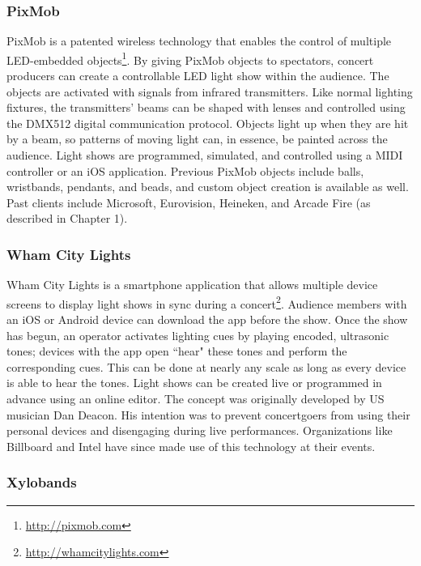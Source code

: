 \subsubsection{PixMob}

PixMob is a patented wireless technology that enables the control of multiple LED-embedded objects\footnote{\url{http://pixmob.com}}. By giving PixMob objects to spectators, concert producers can create a controllable LED light show within the audience. The objects are activated with signals from infrared transmitters. Like normal lighting fixtures, the transmitters' beams can be shaped with lenses and controlled using the DMX512 digital communication protocol. Objects light up when they are hit by a beam, so patterns of moving light can, in essence, be painted across the audience. Light shows are programmed, simulated, and controlled using a MIDI controller or an iOS application. Previous PixMob objects include balls, wristbands, pendants, and beads, and custom object creation is available as well. Past clients include Microsoft, Eurovision, Heineken, and Arcade Fire (as described in Chapter 1).

\subsubsection{Wham City Lights}

Wham City Lights is a smartphone application that allows multiple device screens to display light shows in sync during a concert\footnote{\url{http://whamcitylights.com}}. Audience members with an iOS or Android device can download the app before the show. Once the show has begun, an operator activates lighting cues by playing encoded, ultrasonic tones; devices with the app open ``hear" these tones and perform the corresponding cues. This can be done at nearly any scale as long as every device is able to hear the tones. Light shows can be created live or programmed in advance using an online editor. The concept was originally developed by US musician Dan Deacon. His intention was to prevent concertgoers from using their personal devices and disengaging during live performances. Organizations like Billboard and Intel have since made use of this technology at their events.

\subsubsection{Xylobands}

